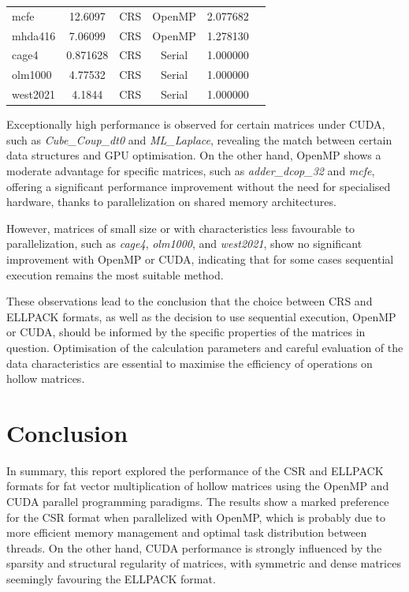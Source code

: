 \documentclass[12pt,oneside]{book} %
\begin{document}
\begin{longtable}{lccccr}
    mcfe              & 12.6097                   & CRS                     & OpenMP               & 2.077682         \\
    mhda416           & 7.06099                   & CRS                     & OpenMP               & 1.278130         \\
    cage4             & 0.871628                  & CRS                     & Serial               & 1.000000         \\
    olm1000           & 4.77532                   & CRS                     & Serial               & 1.000000         \\
    west2021          & 4.1844                    & CRS                     & Serial               & 1.000000         \\
\end{longtable}

Exceptionally high performance is observed for certain matrices under CUDA,
such as \textit{Cube\_Coup\_dt0} and \textit{ML\_Laplace}, revealing the match
between certain data structures and GPU optimisation. On the other hand, OpenMP
shows a moderate advantage for specific matrices, such as
\textit{adder\_dcop\_32} and \textit{mcfe}, offering a significant performance
improvement without the need for specialised hardware, thanks to
parallelization on shared memory architectures.

However, matrices of small size or with characteristics less favourable to
parallelization, such as \textit{cage4}, \textit{olm1000}, and
\textit{west2021}, show no significant improvement with OpenMP or CUDA,
indicating that for some cases sequential execution remains the most suitable
method.

These observations lead to the conclusion that the choice between CRS and
ELLPACK formats, as well as the decision to use sequential execution, OpenMP or
CUDA, should be informed by the specific properties of the matrices in
question. Optimisation of the calculation parameters and careful evaluation of
the data characteristics are essential to maximise the efficiency of operations
on hollow matrices.

\chapter{Conclusion}

In summary, this report explored the performance of the CSR and ELLPACK formats
for fat vector multiplication of hollow matrices using the OpenMP and CUDA
parallel programming paradigms. The results show a marked preference for the
CSR format when parallelized with OpenMP, which is probably due to more
efficient memory management and optimal task distribution between threads. On
the other hand, CUDA performance is strongly influenced by the sparsity and
structural regularity of matrices, with symmetric and dense matrices seemingly
favouring the ELLPACK format.
\end{document}

